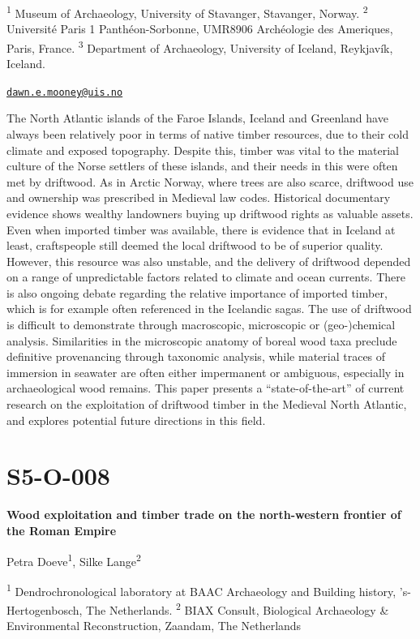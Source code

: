 \documentclass[
]{book}
\begin{document}
\textsuperscript{1} Museum of Archaeology, University of Stavanger, Stavanger, Norway. \textsuperscript{2} Université Paris 1 Panthéon-Sorbonne, UMR8906 Archéologie des Ameriques, Paris, France. \textsuperscript{3} Department of Archaeology, University of Iceland, Reykjavík, Iceland.

\href{mailto:dawn.e.mooney@uis.no}{\nolinkurl{dawn.e.mooney@uis.no}}

The North Atlantic islands of the Faroe Islands, Iceland and Greenland have always been relatively poor in terms of native timber resources, due to their cold climate and exposed topography. Despite this, timber was vital to the material culture of the Norse settlers of these islands, and their needs in this were often met by driftwood. As in Arctic Norway, where trees are also scarce, driftwood use and ownership was prescribed in Medieval law codes. Historical documentary evidence shows wealthy landowners buying up driftwood rights as valuable assets. Even when imported timber was available, there is evidence that in Iceland at least, craftspeople still deemed the local driftwood to be of superior quality. However, this resource was also unstable, and the delivery of driftwood depended on a range of unpredictable factors related to climate and ocean currents. There is also ongoing debate regarding the relative importance of imported timber, which is for example often referenced in the Icelandic sagas. The use of driftwood is difficult to demonstrate through macroscopic, microscopic or (geo-)chemical analysis. Similarities in the microscopic anatomy of boreal wood taxa preclude definitive provenancing through taxonomic analysis, while material traces of immersion in seawater are often either impermanent or ambiguous, especially in archaeological wood remains. This paper presents a ``state-of-the-art'' of current research on the exploitation of driftwood timber in the Medieval North Atlantic, and explores potential future directions in this field.

\hypertarget{s5-o-008}{%
\section*{S5-O-008}\label{s5-o-008}}

\textbf{Wood exploitation and timber trade on the north-western frontier of the Roman Empire}

Petra Doeve\textsuperscript{1}, Silke Lange\textsuperscript{2}

\textsuperscript{1} Dendrochronological laboratory at BAAC Archaeology and Building history, 's-Hertogenbosch, The Netherlands. \textsuperscript{2} BIAX Consult, Biological Archaeology \& Environmental Reconstruction, Zaandam, The Netherlands
\end{document}
